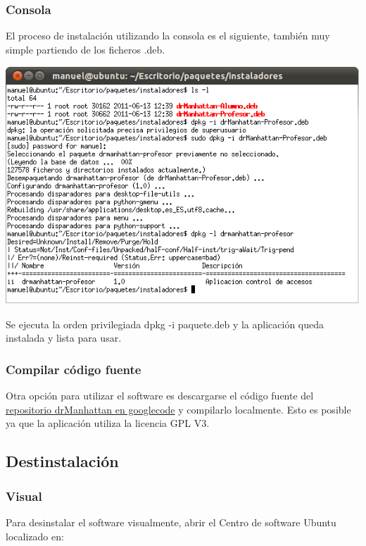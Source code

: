 \documentclass[11pt]{article}
\begin{document}
\subsubsection{Consola}

El proceso de instalación utilizando la consola es el siguiente, también muy simple partiendo de los ficheros .deb.


\begin{center}

    \includegraphics[width=.90\linewidth]{imagenes/instalacionConsola}

\end{center}

Se ejecuta la orden privilegiada dpkg -i paquete.deb y la aplicación queda instalada y lista para usar.

\subsubsection{Compilar código fuente}

Otra opción para utilizar el software es descargarse el código fuente del \href{http://code.google.com/p/drmanhattan/}{repositorio drManhattan en googlecode} y compilarlo localmente. Esto es posible ya que la aplicación utiliza la licencia GPL V3.

\subsection{Destinstalación}

\subsubsection{Visual}

Para desinstalar el software visualmente, abrir el Centro de software Ubuntu localizado en:
\end{document}
